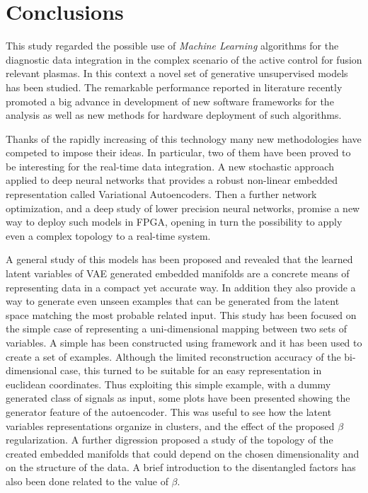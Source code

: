 \chapter{Conclusions}
\label{section:8_conclusions}


This study regarded the possible use of \textit{Machine Learning} algorithms for the diagnostic data integration in the complex scenario of the active control for fusion relevant plasmas.
In this context a novel set of generative unsupervised models has been studied.
The remarkable performance reported in literature recently promoted a big advance in development of new software frameworks for the analysis as well as new methods for hardware deployment of such algorithms.

Thanks of the rapidly increasing of this technology many new methodologies have competed to impose their ideas.
In particular, two of them have been proved to be interesting for the real-time data integration.
A new stochastic approach applied to deep neural networks that provides a robust non-linear embedded representation called Variational Autoencoders.
Then a further network optimization, and a deep study of lower precision neural networks, promise a new way to deploy such models in FPGA, opening in turn the possibility to apply even a complex topology to a real-time system.

A general study of this models has been proposed and revealed that the learned latent variables of VAE generated embedded manifolds are a concrete means of representing data in a compact yet accurate way. In addition they also provide a way to generate even unseen examples that can be generated from the latent space matching the most probable related input.
This study has been focused on the simple case of representing a uni-dimensional mapping between two sets of variables.
A simple  has been constructed using \Tensorflow framework and it has been used to create a set of examples. Although the limited reconstruction accuracy of the bi-dimensional case, this turned to be suitable for an easy representation in euclidean coordinates. 
Thus exploiting this simple example, with a dummy generated class of signals as input, some plots have been presented showing the generator feature of the autoencoder. This was useful to see how the latent variables representations organize in clusters, and the effect of the proposed $\beta$ regularization.
A further digression proposed a study of the topology of the created embedded manifolds that could depend on the chosen dimensionality and on the structure of the data. A brief introduction to the disentangled factors has also been done related to the value of $\beta$.

